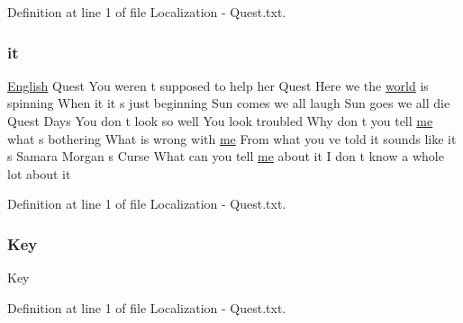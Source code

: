 Definition at line 1 of file Localization -\/ Quest.\+txt.

\mbox{\label{_the_01_restless_01_curse_2_config_2_localization_01-_01_quest_8txt_a741b285909bea4855b886664c2dcd50c}} 
\subsubsection{\texorpdfstring{it}{it}}
{\footnotesize\ttfamily \mbox{\hyperlink{_sphere_i_i_01_winter_01_project_2_config_2_localization_8txt_ad896b63205779b1b09e86d941ce13976}{English}} Quest You weren t supposed to help her Quest Here we the \mbox{\hyperlink{_sphere_i_i_01_music_01_boxes_2_config_2_localization_8txt_a7ede01351426b1b7f6c1ce5f794e474f}{world}} is spinning When it it s just beginning Sun comes we all laugh Sun goes we all die Quest Days You don t look so well You look troubled Why don t you tell \mbox{\hyperlink{_blooms_01_animal_01_husbandry_2_config_2_localization_8txt_a290fbecf7c016b09bc675718400d6fca}{me}} what s bothering What is wrong with \mbox{\hyperlink{_blooms_01_animal_01_husbandry_2_config_2_localization_8txt_a290fbecf7c016b09bc675718400d6fca}{me}} From what you ve told it sounds like it s Samara Morgan s Curse What can you tell \mbox{\hyperlink{_blooms_01_animal_01_husbandry_2_config_2_localization_8txt_a290fbecf7c016b09bc675718400d6fca}{me}} about it I don t know a whole lot about it}



Definition at line 1 of file Localization -\/ Quest.\+txt.

\mbox{\label{_the_01_restless_01_curse_2_config_2_localization_01-_01_quest_8txt_ab3c7af4820830f9166ede9e5623c4e73}} 
\subsubsection{\texorpdfstring{Key}{Key}}
{\footnotesize\ttfamily Key}



Definition at line 1 of file Localization -\/ Quest.\+txt.

